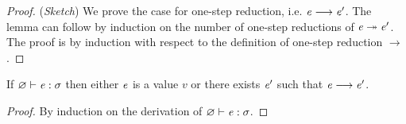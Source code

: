 \begin{proof}
    (\emph{Sketch}) We prove the case for one-step reduction, i.e. $\mathit{e}  \longrightarrow  \mathit{e'}$. The lemma can follow by induction on the number of one-step reductions
of $\mathit{e}  \twoheadrightarrow  \mathit{e'}$.
    The proof is by induction with respect to the definition of one-step
reduction $ \longrightarrow $.
\end{proof}

\begin{thm}[Progress]\label{lem:ecore:prog}
If $\varnothing  \vdash  \mathit{e}  :  \sigma$ then either $\mathit{e}$ is a value $v$ or there exists $\mathit{e}'$
such that $\mathit{e}  \longrightarrow  \mathit{e'}$.
\end{thm}

\begin{proof}
    By induction on the derivation of $\varnothing  \vdash  \mathit{e}  :  \sigma$.
\end{proof}
